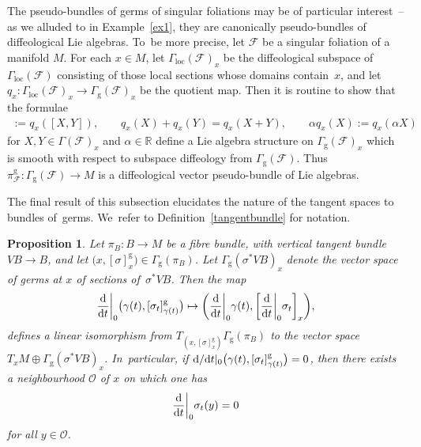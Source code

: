 \documentclass[10pt,a4paper]{amsart}
\numberwithin{equation}{section}
\newtheorem{Proposition}[Theorem]{Proposition}
\def\loc{\operatorname{loc}}
\def\g{\operatorname{g}}
\def\FF{{\mathcal{F}}}
\def\OO{{\mathcal{O}}}
\def\RB{{\mathbb{R}}}
\begin{document}
\begin{Remark}
The pseudo-bundles of germs of singular foliations may be of particular interest~-- as we alluded to in Example~\ref{ex1}, they are canonically pseudo-bundles of diffeological Lie algebras. To~be more precise, let $\FF$ be a singular foliation of a manifold $M$. For each $x\in M$, let $\Gamma_{\loc}(\FF)_{x}$ be the diffeological subspace of $\Gamma_{\loc}(\FF)$ consisting of those local sections whose domains con\-tain~$x$, and let $q_{x}\colon \Gamma_{\loc}(\FF)_{x}\rightarrow\Gamma_{\g}(\FF)_{x}$ be the quotient map. Then it is routine to show that the formulae
\begin{gather*}
[q_{x}(X),q_{x}(Y)]:=q_{x}([X,Y]),\qquad
q_{x}(X)+q_{x}(Y) =q_{x}(X+Y),\qquad
\alpha q_{x}(X):=q_{x}(\alpha X)
\end{gather*}
for $X,Y\in\Gamma(\FF)_{x}$ and $\alpha\in\RB$ define a Lie algebra structure on $\Gamma_{\g}(\FF)_{x}$ which is smooth with respect to subspace diffeology from $\Gamma_{\g}(\FF)$. Thus $\pi_{\FF}^{\g}\colon \Gamma_{\g}(\FF)\rightarrow M$ is a diffeological vector pseudo-bundle of Lie algebras.
\end{Remark}

The final result of this subsection elucidates the nature of the tangent spaces to bundles of~germs. We~refer to Definition~\ref{tangentbundle} for notation.

\begin{Proposition}\label{tangentgerm}
Let $\pi_{B}\colon B\rightarrow M$ be a fibre bundle, with vertical tangent bundle $VB\rightarrow B$, and let $\big(x,[\sigma]^{\g}_{x}\big)\in\Gamma_{\g}(\pi_{B})$. Let $\Gamma_{\g}(\sigma^{*}VB)_{x}$ denote the vector space of germs at $x$ of sections of~$\sigma^{*}VB$. Then the map
\begin{gather}\label{tangerm}
\frac{\rm d}{{\rm d}t}\bigg|_{0}\big(\gamma(t),[\sigma_{t}]^{\g}_{\gamma(t)}\big) \mapsto \bigg(\frac{\rm d}{{\rm d}t}\bigg|_{0}\gamma(t),\bigg[\frac{\rm d}{{\rm d}t}\bigg|_{0}\sigma_{t}\bigg]_{x}\bigg),
\end{gather}
defines a linear isomorphism from $T_{\left(x,[\sigma]^{\g}_{x}\right)}\Gamma_{\g}(\pi_{B})$ to the vector space $T_{x}M\oplus\Gamma_{\g}(\sigma^{*}VB)_{x}$. In~particular, if ${\rm d}/{\rm d}t|_{0}\big(\gamma(t),[\sigma_{t}]^{\g}_{\gamma(t)}\big) = 0$, then there exists a neighbourhood $\OO$ of $x$ on which one has
\begin{gather*}
\frac{\rm d}{{\rm d}t}\bigg|_{0}\sigma_{t}(y) = 0
\end{gather*}
for all $y\in\OO$.
\end{Proposition}
\end{document}
